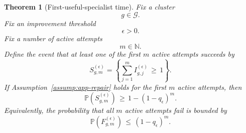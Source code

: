 \documentclass{article} %
\newtheorem{theorem}{Theorem}
\begin{document}
\begin{theorem}[First-useful-specialist time]
\label{thm:generalization}
Fix a cluster
\begin{equation}
\label{eq:app-third-thm-g}
g
\in
\mathcal{G}.
\end{equation}
Fix an improvement threshold
\begin{equation}
\label{eq:app-third-thm-eps}
\epsilon
>
0.
\end{equation}
Fix a number of active attempts
\begin{equation}
\label{eq:app-third-thm-m}
m
\in
\mathbb{N}.
\end{equation}
Define the event that at least one of the first \(m\) active attempts succeeds by
\begin{equation}
\label{eq:app-third-success-event}
S_{g,m}^{(\epsilon)}
=
\left\{
\sum_{j=1}^{m}
I_{g,j}^{(\epsilon)}
\,\ge\,
1
\right\}.
\end{equation}
If Assumption~\ref{assump:app-repair} holds for the first \(m\) active attempts, then
\begin{equation}
\label{eq:app-third-main-bound}
\mathbb{P}\!\left(
S_{g,m}^{(\epsilon)}
\right)
\,\ge\,
1-(1-q_{\epsilon})^{m}.
\end{equation}
Equivalently, the probability that all \(m\) active attempts fail is bounded by
\begin{equation}
\label{eq:app-third-tail-bound}
\mathbb{P}\!\left(
F_{g,m}^{(\epsilon)}
\right)
\,\le\,
(1-q_{\epsilon})^{m}.
\end{equation}
\end{theorem}
\end{document}
